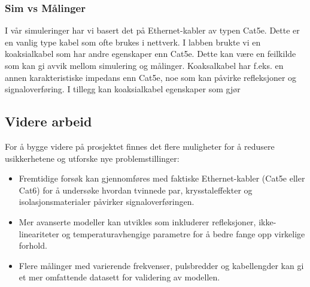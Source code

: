 \subsubsection{Sim vs Målinger}
I vår simuleringer har vi basert det på Ethernet-kabler av typen Cat5e. Dette er en vanlig type kabel som ofte brukes i nettverk. I labben brukte vi en koaksialkabel som har andre egenskaper enn Cat5e. Dette kan være en feilkilde som kan gi avvik mellom simulering og målinger. Koaksalkabel har f.eks. en annen karakteristiske impedans enn Cat5e, noe som kan påvirke refleksjoner og signaloverføring. I tillegg kan koaksialkabel egenskaper som gjør 

\subsection{Videre arbeid}
For å bygge videre på prosjektet finnes det flere muligheter for å redusere usikkerhetene og utforske nye problemstillinger:
\begin{itemize}
    \item Fremtidige forsøk kan gjennomføres med faktiske Ethernet-kabler (Cat5e eller Cat6) for å undersøke hvordan tvinnede par, krysstaleffekter og isolasjonsmaterialer påvirker signaloverføringen.
    \item Mer avanserte modeller kan utvikles som inkluderer refleksjoner, ikke-lineariteter og temperaturavhengige parametre for å bedre fange opp virkelige forhold.
    \item Flere målinger med varierende frekvenser, pulsbredder og kabellengder kan gi et mer omfattende datasett for validering av modellen.
\end{itemize}
